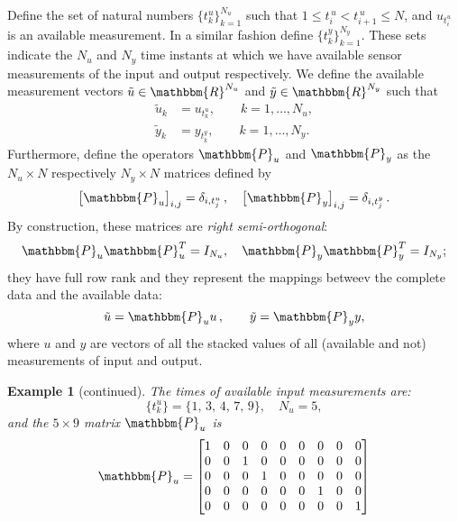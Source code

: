 \documentclass[10pt]{article}
\newcommand{\R}{\mathbbm{R}}
\renewcommand{\P}{\mathbbm{P}}
\newcommand{\rmatrix}[1]{\begin{bmatrix}#1\end{bmatrix}}
\newtheorem{example}{Example}
\begin{document}
Define the set of natural numbers ${\{t^u_k\}}_{k=1}^{N_u}$ such that
$1\leq t^{\,u}_i < t^{\,u}_{i+1}\leq N$, and $u_{t^{u}_i}$ is an
available measurement. In a similar fashion define ${\{t^y_k\}}_{k=1}^{N_y}$.
These sets indicate the $N_u$ and $N_y$ time instants at
which we have available sensor measurements of the input and output
respectively. We
define the available measurement vectors $\tilde u\in \R^{N_u}$ and
$\tilde y\in \R^{N_y}$ such that
\begin{equation}
  \begin{split}
    \tilde u_k &= u_{t^u_k}, \qquad k=1,\dots, N_u,\\
    \tilde y_k &= y_{t^y_k}, \qquad k=1,\dots, N_y.
  \end{split}
\end{equation}
Furthermore, define the operators $\P_u$ and $\P_y$ as the $N_u
\times N$ respectively $N_y\times N$ matrices defined by
\begin{equation}
  {\big[\P_u\big]}_{i,j} = \delta_{i,t^u_j}\,,\quad {\big[\P_y\big]}_{i,j} = \delta_{i,t^{y}_j}\,.
\end{equation}
By construction, these matrices are \emph{right semi-orthogonal}:
\begin{equation}\label{eq:semi-orthogonal}
  \P_u\P_u^T = I_{N_u},\quad
  \P_y\P_y^T = I_{N_y};
\end{equation}
they have full row rank and they represent the mappings betweev the complete
data and the available data:
\begin{equation}
  \tilde u = \P_u u\,, \qquad \tilde y = \P_y y,
\end{equation}
where $u$ and $y$ are vectors of all the stacked values of all (available and
  not) measurements of input and output.
\setcounter{example}{0}
\begin{example}[continued]
  The times of available input measurements are:
  \begin{equation}
    \{t^{u}_k\} = \{1,\,3,\,4,\,7,\,9\}, \quad N_u = 5,
  \end{equation}
  and the $5\times9$ matrix $\P_u$ is
  \begin{equation}
    \P_u =
    \rmatrix{
      1 & 0 & 0 & 0 & 0 & 0 & 0 & 0 & 0\\
      0 & 0 & 1 & 0 & 0 & 0 & 0 & 0 & 0\\
      0 & 0 & 0 & 1 & 0 & 0 & 0 & 0 & 0\\
      0 & 0 & 0 & 0 & 0 & 0 & 1 & 0 & 0\\
      0 & 0 & 0 & 0 & 0 & 0 & 0 & 0 & 1
    }
  \end{equation}
\end{example}
\vspace{0.5em}
\end{document}
